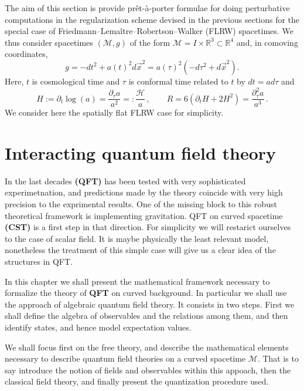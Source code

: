 \documentclass[12pt]{book}
\newcommand{\Hcal}{\mathcal{H}}
\newcommand{\Mcal}{\mathcal{M}}
\newcommand{\Rbb}{\mathbb{R}}
\theoremstyle{break}
\begin{document}
The aim of this section is provide pr\^et-\`a-porter formulae for doing perturbative computations in the regularization scheme devised in the previous sections for the special case of Friedmann--Lema\^itre--Robertson--Walker (FLRW) spacetimes. We thus consider spacetimes $(\Mcal,g)$ of the form $\Mcal=I\times \Rbb^3\subset \Rbb^4$ and, in comoving coordinates,
$$g= -dt^2 + a(t)^2 d\vec{x}^2=a(\tau)^2\left(-d\tau^2+d\vec{x}^2\right).$$
Here, $t$ is cosmological time and $\tau$ is conformal time related to $t$ by $dt = a d\tau$ and 
\begin{equation}
\label{eq:rflrw} H:=\partial_t \log (a) = \frac{\partial_\tau a}{a^2}=:\frac{\Hcal}{a}\,,\qquad R=6(\partial_t H + 2 H^2)=\frac{\partial^2_\tau a}{a^3}\,. 
\end{equation}
%
We consider here the spatially flat FLRW case for simplicity. 



\chapter{Interacting quantum field theory}


In the last decades \textbf{(QFT)} has been tested with very sophisticated experimetnation, and predictions made by the theory coincide with very high precision to the exprimental results. One of the missing block to this robust theoretical framework is implementing gravitation. QFT on curved spacetime \textbf{(CST)} is a first step in that direction. For simplicity we will restarict ourselves to the case of scalar field. It is maybe physically the least relevant model, nonetheless the treatment of this simple case will give us a clear idea of the structures in QFT.\par%



In this chapter we shall present the mathematical framework necessary to formalize the theory of \textbf{QFT} on curved background. In particular we shall use the approach of algebraic quantum field theory. It consists in two steps. First we shall define the algebra of observables and the relations among them, and then identify states, and hence model expectation values.




We shall focus first on the free theory, and describe the mathematical elements necessary to describe quantum field theories on a curved spacetime $\Mcal$. That is to say introduce the notion of fields and observables within this appoach, then the classical field theory, and finally present the quantization procedure used. 
\par%
\end{document}
